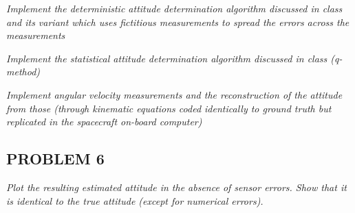 \textit{Implement the deterministic attitude determination algorithm discussed in class and its variant which uses fictitious measurements to spread the errors across the measurements}

\textit{Implement the statistical attitude determination algorithm discussed in class (q-method)}

\textit{Implement angular velocity measurements and the reconstruction of the attitude from those (through kinematic equations coded identically to ground truth but replicated in the spacecraft on-board computer)}

\subsection{PROBLEM 6}
\textit{Plot the resulting estimated attitude in the absence of sensor errors. Show that it is identical to the true attitude (except for numerical errors).}